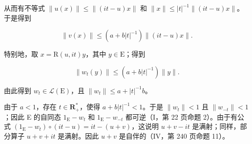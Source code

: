 从而有不等式 \(\|u(x)\|\leqslant\|(it-u)x\|\) 和 \(\|x\|\leqslant|t|^{-1}\|(it-u)x\|\)。于是得到

\[
\| v (x) \| \leqslant (a + b | t | ^ {- 1}) \| (i t - u) x \|.
\]

特别地，取 \(x = \mathrm{R}(u, it)y\)，其中 \(y \in \mathrm{E}\)；得到

\[
\| w _ {t} (y) \| \leqslant (a + b | t | ^ {- 1}) \| y \|.
\]

由此得到 \(w_{t}\in\mathcal{L}(\mathrm{E})\)，且 \(\|w_{t}\|\leqslant a+|t|^{-1}b\)。

由于 \(a < 1\)，存在 \(t \in \mathbf{R}_{+}^{*}\)，使得 \(a + b|t|^{-1} < 1\)。于是 \(\|w_{t}\| < 1\) 且 \(\|w_{-t}\| < 1\)；因此 E 的自同态 \(1_{\mathrm{E}} - w_{t}\) 和 \(1_{\mathrm{E}} - w_{-t}\) 都可逆（I，第 22 页命题 2）。由于有公式 \((1_{\mathrm{E}} - w_{t}) \circ (it - u) = it - (u + v)\)，这说明 \(u + v - it\) 是满射；同样，部分算子 \(u + v + it\) 是满射。因此 \(u + v\) 是自伴的（IV，第 240 页命题 11）。

